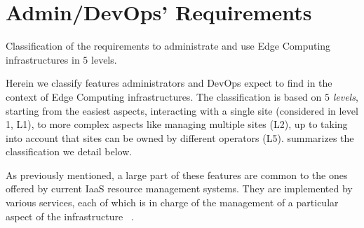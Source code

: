 
\section{Admin/DevOps' Requirements}
\label{sec:requirements}

%   

\begin{table*}
    \centering
    
    \vspace*{-.1cm}
    \caption{Classification of the requirements to administrate and use Edge
    Computing infrastructures in $5$ levels.}
  \label{tab:requirements}
      \vspace*{-.2cm}
\end{table*}

Herein we classify features administrators and DevOps expect
to find in the context of Edge Computing infrastructures.
The classification is based on $5$ \emph{levels}, starting from the easiest
aspects, \ie interacting with a single site (considered in level 1, L1), to
more complex aspects like managing multiple sites (L2), up to taking into account that
sites can be owned by different operators (L5).
 summarizes the classification we detail below.

As previously mentioned, a large part of these features are common to
the ones offered by current IaaS resource management systems. They are
implemented by various services, each of which is in charge of the
management of a particular aspect of the infrastructure
~\cite{moreno2012csp}.

